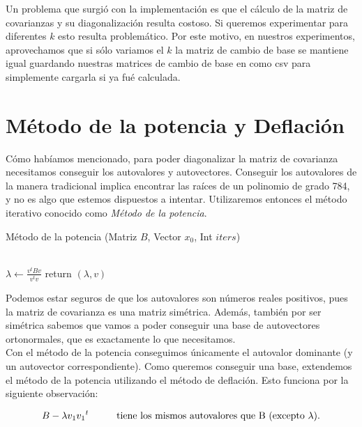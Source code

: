 Un problema que surgió con la implementación es que el cálculo de la matriz de covarianzas y su diagonalización resulta costoso. Si queremos experimentar para diferentes $k$ esto resulta problemático. Por este motivo, en nuestros experimentos, aprovechamos que si sólo variamos el $k$ la matriz de cambio de base se mantiene igual guardando nuestras matrices de cambio de base en como csv para simplemente cargarla si ya fué calculada. \\

\section{Método de la potencia y Deflación}

Cómo habíamos mencionado, para poder diagonalizar la matriz de covarianza necesitamos conseguir los autovalores y autovectores. Conseguir los autovalores de la manera tradicional implica encontrar las raíces de un polinomio de grado 784, y no es algo que estemos dispuestos a intentar. Utilizaremos entonces el método iterativo conocido como \textit{Método de la potencia}.
\begin{algorithm}
    \caption{Método de la potencia (Matriz $B$, Vector $x_0$, Int $iters$)}
    \begin{algorithmic}[h]
             \\
        \EndFor
        \State  $\lambda \gets \frac{v^tBv}{v^tv}$
        \State return $(\lambda, v)$

    \end{algorithmic}
\end{algorithm}

Podemos estar seguros de que los autovalores son números reales positivos, pues la matriz de covarianza es una matriz simétrica. Además, también por ser simétrica sabemos que vamos a poder conseguir una base de autovectores ortonormales, que es exactamente lo que necesitamos. \\

Con el método de la potencia conseguimos únicamente el autovalor dominante (y un autovector correspondiente). Como queremos conseguir una base, extendemos el método de la potencia utilizando el método de deflación. Esto funciona por la siguiente observación:

$$ B - \lambda v_1 {v_1}^{t} \text{\hspace{1cm}tiene los mismos autovalores que B (excepto $\lambda$).} $$

